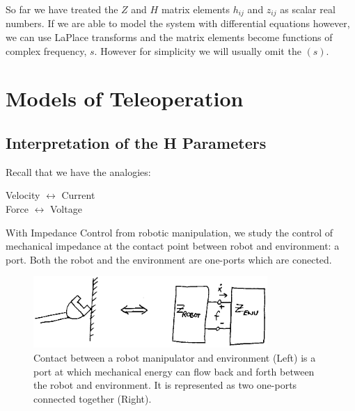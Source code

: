
So far we have treated the $Z$ and $H$ matrix elements $h_{ij}$ and $z_{ij}$ as scalar real numbers.  If we are able to model the system with differential equations however, we can use LaPlace transforms and the matrix elements become functions of complex frequency, $s$.   However for simplicity we will usually omit the $(s)$.	%










\section{Models of Teleoperation}

\subsection{Interpretation of the H Parameters}

Recall that we have the analogies:

\begin{centering}
Velocity $\leftrightarrow$ Current \\
Force    $\leftrightarrow$ Voltage\\
\end{centering}

With Impedance Control from robotic manipulation, we study the control of mechanical impedance at the contact point between robot and environment: a port.  Both the robot and the environment are one-ports which are conected.	%


\begin{figure}[h]	%
\centering \includegraphics[width=3.5in]{figs14/00319.eps}
\caption{Contact between a robot manipulator and environment (Left) is a port at which mechanical energy can flow back and forth between the robot and environment. It is represented as two one-ports connected together (Right).}\label{RobotEnvContact}	%
\end{figure}	%



